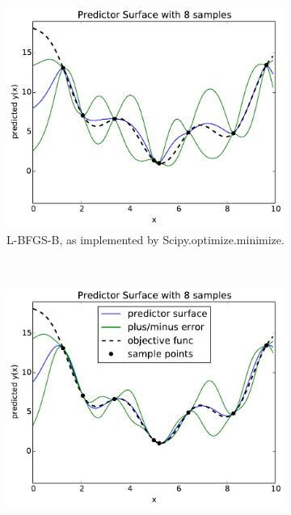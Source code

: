 \begin{figure}
        \centering
        \begin{subfigure}[t]{0.5\textwidth}
                \includegraphics[width=\textwidth]{images/likelihood_opt_ex/bad}
                \caption{L-BFGS-B\cite{}, as implemented by Scipy\linebreak[0].optimize\linebreak[0].minimize. }
        \end{subfigure}%
        ~ %
        \begin{subfigure}[t]{0.5\textwidth}
                \includegraphics[width=\textwidth]{images/likelihood_opt_ex/good}

\end{subfigure}
\end{figure}
